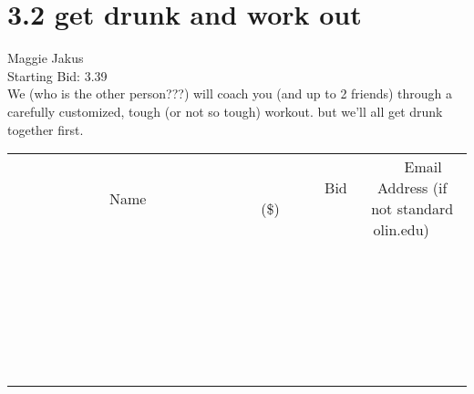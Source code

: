 \documentclass[11pt]{article}
\begin{document}
					\section*{3.2 get drunk and work out}
					Maggie Jakus \\
					Starting Bid: 3.39 \\
					We (who is the other person???) will coach you (and up to 2 friends) through a carefully customized, tough (or not so tough) workout. but we'll all get drunk together first. \\
					[6ex]
					\begin{tabular}{c c c}
						~~~~~~~~~~~~~Name~~~~~~~~~~~~~ & ~~~~~~~~~Bid (\$)~~~~~~~~~ & ~~~Email Address (if not standard olin.edu)~~~ \\
				
 & & \\
\hline
 & & \\
\hline
 & & \\
\hline
 & & \\
\hline
 & & \\
\hline
 & & \\
\hline
 & & \\
\hline
 & & \\
\hline
 & & \\
\hline
 & & \\
\hline
 & & \\
\hline
 & & \\
\hline
 & & \\
\hline
 & & \\
\hline
 & & \\
\hline
 & & \\
\hline
 & & \\
\hline
 & & \\
\hline
 & & \\
\hline
 & & \\
\hline
 & & \\
\hline
 & & \\
\hline
 & & \\
\hline
 & & \\
\hline
 & & \\
\hline
 & & \\
\hline
					\end{tabular}
					\clearpage
				
\end{document}
